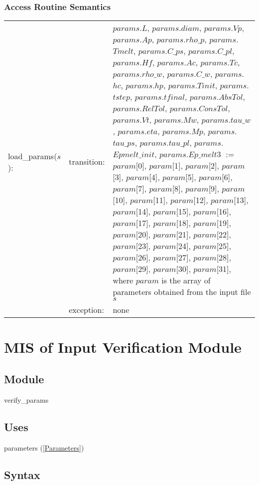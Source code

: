 \documentclass[12pt]{article}
\begin{document}
\subsubsection{Access Routine Semantics}
\begin{center}
\begin{tabular}{l l p{11cm}}
load\_params($s$): & transition: & $params$.$L$, $params$.$diam$, $params$.$Vp$, $params$.$Ap$, $params$.$rho\_p$, $params$.$Tmelt$, $params$.$C\_ps$, $params$.$C\_pl$, $params$.$Hf$, $params$.$Ac$, $params$.$Tc$, $params$.$rho\_w$, $params$.$C\_w$, $params$.$hc$, $params$.$hp$, $params$.$Tinit$, $params$.$tstep$, $params$.$tfinal$, $params$.$AbsTol$, $params$.$RelTol$, $params$.$ConsTol$, $params$.$Vt$, $params$.$Mw$, $params$.$tau\_w$, $params$.$eta$, $params$.$Mp$, $params$.$tau\_ps$, $params$.$tau\_pl$, $params$.$Epmelt\_init$, $params$.$Ep\_melt3$ $:=$ $param$[0], $param$[1], $param$[2], $param$[3], $param$[4], $param$[5], $param$[6], $param$[7], $param$[8], $param$[9], $param$[10], $param$[11], $param$[12], $param$[13], $param$[14], $param$[15], $param$[16], $param$[17], $param$[18], $param$[19], $param$[20], $param$[21], $param$[22], $param$[23], $param$[24], $param$[25], $param$[26], $param$[27], $param$[28], $param$[29], $param$[30], $param$[31], where $param$ is the array of parameters obtained from the input file $s$ \\
& exception: & none \\
\end{tabular}
\end{center}

\section{MIS of Input Verification Module} \label{VerifyInput}
\subsection{Module}
verify\_params
\subsection{Uses}
parameters (\ref{Parameters})
\subsection{Syntax}
\end{document}
